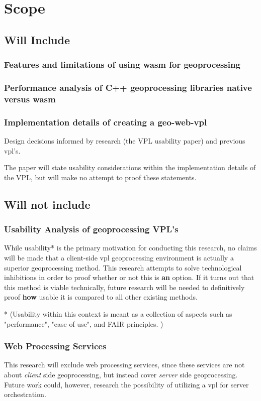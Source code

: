 \section{Scope}


\subsection{Will Include}


\subsubsection*{Features and limitations of using wasm for geoprocessing}


\subsubsection*{Performance analysis of C++ geoprocessing libraries native versus wasm}


\subsubsection*{Implementation details of creating a geo-web-vpl}
Design decisions informed by research (the VPL usability paper) and previous vpl's.

The paper will state usability considerations within the implementation details of the VPL, but will make no attempt to proof these statements. 

\subsection{Will not include}



\subsubsection*{Usability Analysis of geoprocessing VPL's}

While usability* is the primary motivation for conducting this research, no claims will be made that a client-side vpl geoprocessing environment is actually a superior geoprocessing method. This research attempts to solve technological inhibitions in order to proof whether or not this is \textbf{an} option. If it turns out that this method is viable technically, future research will be needed to definitively proof \textbf{how} usable it is compared to all other existing methods.  

* (Usability within this context is meant as a collection of aspects such as "performance", "ease of use", and FAIR principles. )

\subsubsection*{Web Processing Services}

This research will exclude web processing services, since these services are not about \emph{client} side geoprocessing, but instead cover \emph{server} side geoprocessing. 
Future work could, however, research the possibility of utilizing a vpl for server orchestration. 


